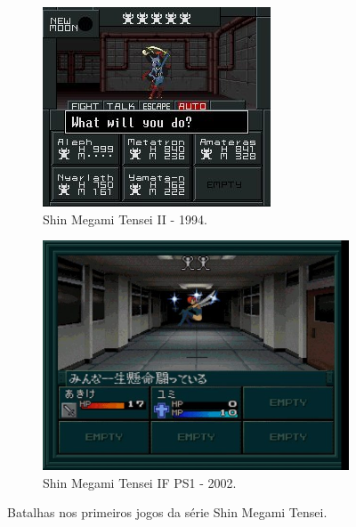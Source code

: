 \begin{figure}[h!]
\begin{subfigure}[b]{0.4\linewidth}
  \end{subfigure}
  \begin{subfigure}[b]{0.4\linewidth}
    \includegraphics[width=\linewidth]{smt2b.jpg}
    \caption{Shin Megami Tensei II - 1994.}
  \end{subfigure}
  \begin{subfigure}[b]{0.4\linewidth}
    \includegraphics[width=\linewidth]{smtifb.jpg}
    \caption{Shin Megami Tensei IF PS1 - 2002.}
  \end{subfigure}
  \caption{Batalhas nos primeiros jogos da série Shin Megami Tensei.}
  \label{fig:smtb}
\end{figure}

